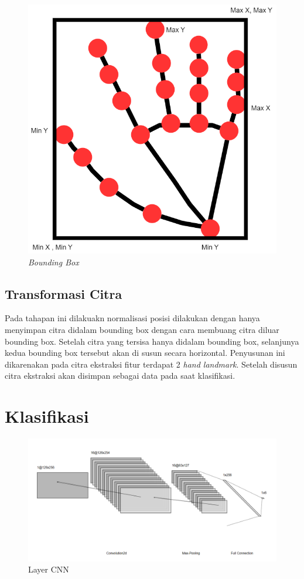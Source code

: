\begin{figure}[H]
  \centering
  \includegraphics[width=0.5\linewidth]{../Gambar/boundingbox.png}
  \caption{\emph{Bounding Box}}
  \label{fig:boundingbox}
\end{figure}

\subsection{Transformasi Citra}
Pada tahapan ini dilakuakn normalisasi posisi dilakukan dengan hanya menyimpan citra didalam bounding box dengan cara membuang citra diluar bounding box. Setelah citra yang tersisa hanya didalam bounding box, selanjunya kedua bounding box tersebut akan di susun secara horizontal. Penyusunan ini dikarenakan pada citra ekstraksi fitur terdapat 2 \emph{hand landmark}. Setelah disusun citra ekstraksi akan disimpan sebagai data pada saat klasifikasi.

\section{Klasifikasi}

\begin{figure}[!h]
  \centering
  \includegraphics[width=1\linewidth]{../Gambar/LayerCnn.png}
  \caption{Layer CNN}
  \label{fig:layerCNn}
\end{figure}

